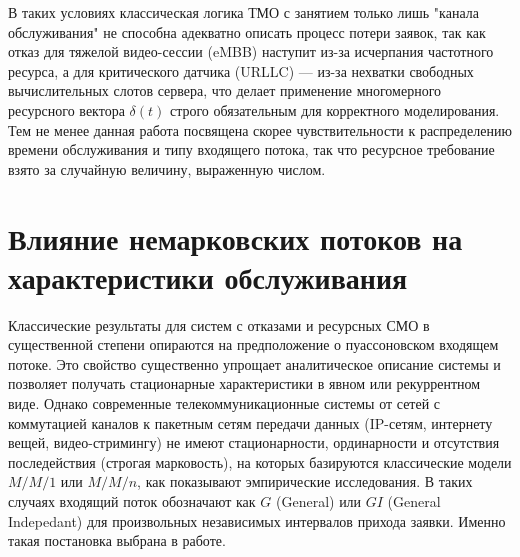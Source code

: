 В таких условиях классическая логика ТМО с занятием только лишь "канала обслуживания" не способна адекватно описать процесс потери заявок, так как отказ для тяжелой видео-сессии (eMBB) наступит из-за исчерпания частотного ресурса, а для критического датчика (URLLC) --- из-за нехватки свободных вычислительных слотов сервера, что делает применение многомерного ресурсного вектора $\delta(t)$ строго обязательным для корректного моделирования. Тем не менее данная работа посвящена скорее чувствительности к распределению времени обслуживания и типу входящего потока, так что ресурсное требование взято за случайную величину, выраженную числом.



\section{Влияние немарковских потоков на характеристики обслуживания}
\label{sec:non_markovian_service}

Классические результаты для систем с отказами и ресурсных СМО в существенной степени опираются на предположение о пуассоновском входящем потоке. Это свойство существенно упрощает аналитическое описание системы и позволяет получать стационарные характеристики в явном или рекуррентном виде. Однако современные телекоммуникационные системы от сетей с коммутацией каналов к пакетным сетям передачи данных (IP-сетям, интернету вещей, видео-стримингу) не имеют стационарности, ординарности и отсутствия последействия (строгая марковость), на которых базируются классические модели $M/M/1$ или $M/M/n$, как показывают эмпирические исследования. В таких случаях входящий поток обозначают как $G$ (General) или $GI$ (General Indepedant) для произвольных независимых интервалов прихода заявки. Именно такая постановка выбрана в работе. 

